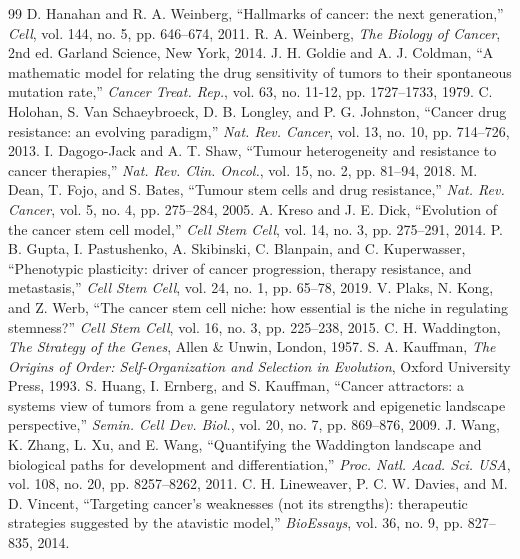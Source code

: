 \documentclass[11pt,a4paper]{article}
\begin{document}
\begin{thebibliography}{99}
 D. Hanahan and R. A. Weinberg, ``Hallmarks of cancer: the next generation,'' \textit{Cell}, vol. 144, no. 5, pp. 646--674, 2011.
 R. A. Weinberg, \textit{The Biology of Cancer}, 2nd ed. Garland Science, New York, 2014.
 J. H. Goldie and A. J. Coldman, ``A mathematic model for relating the drug sensitivity of tumors to their spontaneous mutation rate,'' \textit{Cancer Treat. Rep.}, vol. 63, no. 11-12, pp. 1727--1733, 1979.
 C. Holohan, S. Van Schaeybroeck, D. B. Longley, and P. G. Johnston, ``Cancer drug resistance: an evolving paradigm,'' \textit{Nat. Rev. Cancer}, vol. 13, no. 10, pp. 714--726, 2013.
 I. Dagogo-Jack and A. T. Shaw, ``Tumour heterogeneity and resistance to cancer therapies,'' \textit{Nat. Rev. Clin. Oncol.}, vol. 15, no. 2, pp. 81--94, 2018.
 M. Dean, T. Fojo, and S. Bates, ``Tumour stem cells and drug resistance,'' \textit{Nat. Rev. Cancer}, vol. 5, no. 4, pp. 275--284, 2005.
 A. Kreso and J. E. Dick, ``Evolution of the cancer stem cell model,'' \textit{Cell Stem Cell}, vol. 14, no. 3, pp. 275--291, 2014.
 P. B. Gupta, I. Pastushenko, A. Skibinski, C. Blanpain, and C. Kuperwasser, ``Phenotypic plasticity: driver of cancer progression, therapy resistance, and metastasis,'' \textit{Cell Stem Cell}, vol. 24, no. 1, pp. 65--78, 2019.
 V. Plaks, N. Kong, and Z. Werb, ``The cancer stem cell niche: how essential is the niche in regulating stemness?'' \textit{Cell Stem Cell}, vol. 16, no. 3, pp. 225--238, 2015.
 C. H. Waddington, \textit{The Strategy of the Genes}, Allen \& Unwin, London, 1957.
 S. A. Kauffman, \textit{The Origins of Order: Self-Organization and Selection in Evolution}, Oxford University Press, 1993.
 S. Huang, I. Ernberg, and S. Kauffman, ``Cancer attractors: a systems view of tumors from a gene regulatory network and epigenetic landscape perspective,'' \textit{Semin. Cell Dev. Biol.}, vol. 20, no. 7, pp. 869--876, 2009.
 J. Wang, K. Zhang, L. Xu, and E. Wang, ``Quantifying the Waddington landscape and biological paths for development and differentiation,'' \textit{Proc. Natl. Acad. Sci. USA}, vol. 108, no. 20, pp. 8257--8262, 2011.
 C. H. Lineweaver, P. C. W. Davies, and M. D. Vincent, ``Targeting cancer's weaknesses (not its strengths): therapeutic strategies suggested by the atavistic model,'' \textit{BioEssays}, vol. 36, no. 9, pp. 827--835, 2014.

\end{thebibliography}
\end{document}
